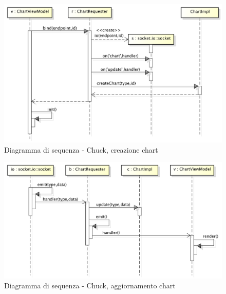 
        


            \begin{figure}[H]
                \centering
                \includegraphics[scale=0.3]{DefinizioneDiProdotto/Pics/ChuckInserimentoChart}
                \caption{Diagramma di sequenza - Chuck, creazione chart}
            \end{figure}


            \begin{figure}[H]
                \centering
                \includegraphics[scale=0.3]{DefinizioneDiProdotto/Pics/ChuckAggiornamentoChart}
                \caption{Diagramma di sequenza - Chuck, aggiornamento chart}
            \end{figure}